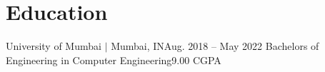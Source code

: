 \documentclass[../../resume]{subfiles}
\begin{document}
\section{Education}
  \resumeSubHeadingListStart
    \resumeSubheading
      {University of Mumbai $|$ Mumbai, IN}{Aug. 2018 -- May 2022}
      {Bachelors of Engineering in Computer Engineering}{9.00 CGPA}
  \resumeSubHeadingListEnd
\end{document}
